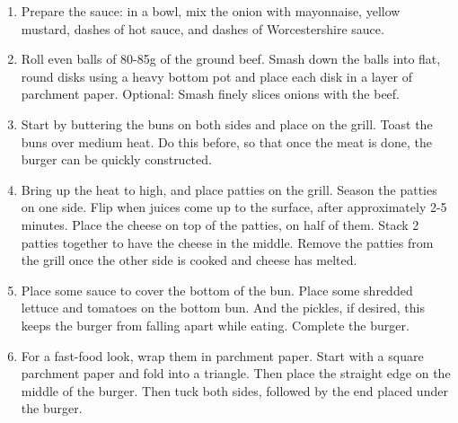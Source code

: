 \begin{enumerate}
    \item Prepare the sauce: in a bowl, mix the onion with mayonnaise, yellow mustard, dashes of hot sauce, and dashes of Worcestershire sauce.
    \item Roll even balls of 80-85g of the ground beef. Smash down the balls into flat, round disks using a heavy bottom pot and place each disk in a layer of parchment paper. Optional: Smash finely slices onions with the beef.
    \item Start by buttering the buns on both sides and place on the grill. Toast the buns over medium heat. Do this before, so that once the meat is done, the burger can be quickly constructed.
    \item Bring up the heat to high, and place patties on the grill. Season the patties on one side. Flip when juices come up to the surface, after approximately 2-5 minutes. Place the cheese on top of the patties, on half of them. Stack 2 patties together to have the cheese in the middle. Remove the patties from the grill once the other side is cooked and cheese has melted.
    \item Place some sauce to cover the bottom of the bun. Place some shredded lettuce and tomatoes on the bottom bun. And the pickles, if desired, this keeps the burger from falling apart while eating.
    Complete the burger.
    \item For a fast-food look, wrap them in parchment paper. Start with a square parchment paper and fold into a triangle. Then place the straight edge on the middle of the burger. Then tuck both sides, followed by the end placed under the burger.
\end{enumerate}

